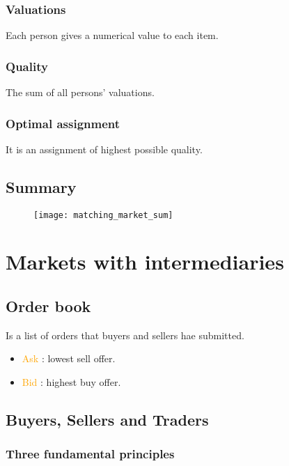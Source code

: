 \subsubsection{Valuations}

Each person gives a numerical value to each item.

\subsubsection{Quality}

The sum of all persons' valuations.

\subsubsection{Optimal assignment}

It is an assignment of highest possible quality.

\subsection{Summary}

\begin{figure}[H]
    \centering
    \texttt{[image: matching\_market\_sum]}
\end{figure}

\section{Markets with intermediaries}

\subsection{Order book}

Is a list of orders that buyers and sellers hae submitted.

\begin{itemize}
\item \textcolor{orange}{Ask} : lowest sell offer.
\item \textcolor{orange}{Bid} : highest buy offer.
\end{itemize}

\subsection{Buyers, Sellers and Traders}

\subsubsection{Three fundamental principles}

